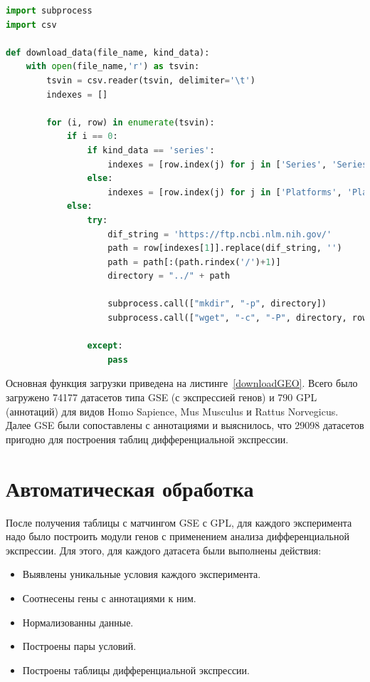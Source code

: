 \documentclass[times,specification,annotation]{itmo-student-thesis}
\begin{document}
\begin{lstlisting}[float=!h, caption={Загрузка данных из GEO.}, captionpos=b, label={downloadGEO}, basicstyle=\footnotesize, language=Python]
import subprocess
import csv

def download_data(file_name, kind_data): 
    with open(file_name,'r') as tsvin:
        tsvin = csv.reader(tsvin, delimiter='\t')
        indexes = []
        
        for (i, row) in enumerate(tsvin):
            if i == 0:
                if kind_data == 'series':
                    indexes = [row.index(j) for j in ['Series', 'Series_url']]
                else:
                    indexes = [row.index(j) for j in ['Platforms', 'Platforms_url']]
            else:    
                try:
                    dif_string = 'https://ftp.ncbi.nlm.nih.gov/'
                    path = row[indexes[1]].replace(dif_string, '')
                    path = path[:(path.rindex('/')+1)]
                    directory = "../" + path

                    subprocess.call(["mkdir", "-p", directory])
                    subprocess.call(["wget", "-c", "-P", directory, row[indexes[1]]])

                except:
                    pass

\end{lstlisting}


Основная функция загрузки приведена на листинге~\ref{downloadGEO}. Всего было загружено 74177 датасетов типа GSE (с экспрессией генов) и 790 GPL (аннотаций) для видов Homo Sapience, Mus Musculus и Rattus Norvegicus. Далее GSE были сопоставлены с аннотациями и выяснилось, что 29098 датасетов пригодно для построения таблиц ​дифференциальной экспрессии.


\section{Автоматическая обработка}

После получения таблицы с матчингом GSE с GPL, для каждого эксперимента надо было построить модули генов с применением анализа дифференциальной экспрессии. Для этого, для каждого датасета были выполнены действия:
\begin{itemize}
    \item Выявлены уникальные условия каждого эксперимента.
    \item Соотнесены гены с аннотациями к ним.
    \item Нормализованны данные.
    \item Построены пары условий.
    \item Построены таблицы дифференциальной экспрессии.
\end{itemize}
\end{document}
